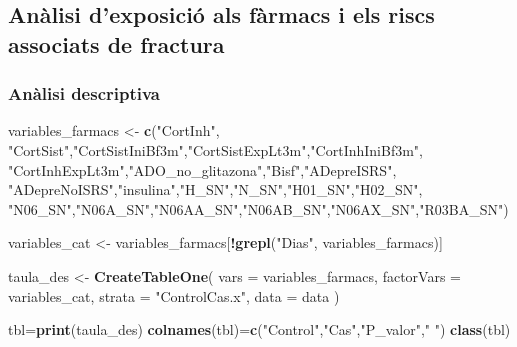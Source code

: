\documentclass[
]{article}
\newenvironment{Shaded}{\begin{snugshade}}{\end{snugshade}}
\newcommand{\AttributeTok}[1]{\textcolor[rgb]{0.13,0.29,0.53}{#1}}
\newcommand{\FunctionTok}[1]{\textcolor[rgb]{0.13,0.29,0.53}{\textbf{#1}}}
\newcommand{\NormalTok}[1]{#1}
\newcommand{\OtherTok}[1]{\textcolor[rgb]{0.56,0.35,0.01}{#1}}
\newcommand{\SpecialCharTok}[1]{\textcolor[rgb]{0.81,0.36,0.00}{\textbf{#1}}}
\newcommand{\StringTok}[1]{\textcolor[rgb]{0.31,0.60,0.02}{#1}}
\begin{document}
\subsection{Anàlisi d'exposició als fàrmacs i els riscs associats de
fractura}\label{anuxe0lisi-dexposiciuxf3-als-fuxe0rmacs-i-els-riscs-associats-de-fractura}

\subsubsection{Anàlisi descriptiva}\label{anuxe0lisi-descriptiva}

\label{anx:descrip}

\begin{Shaded}
\begin{Highlighting}[]
\NormalTok{variables\_farmacs }\OtherTok{\textless{}{-}} \FunctionTok{c}\NormalTok{(}\StringTok{"CortInh"}\NormalTok{,}
\StringTok{"CortSist"}\NormalTok{,}\StringTok{"CortSistIniBf3m"}\NormalTok{,}\StringTok{"CortSistExpLt3m"}\NormalTok{,}\StringTok{"CortInhIniBf3m"}\NormalTok{,}
\StringTok{"CortInhExpLt3m"}\NormalTok{,}\StringTok{"ADO\_no\_glitazona"}\NormalTok{,}\StringTok{"Bisf"}\NormalTok{,}\StringTok{"ADepreISRS"}\NormalTok{,}
\StringTok{"ADepreNoISRS"}\NormalTok{,}\StringTok{"insulina"}\NormalTok{,}\StringTok{"H\_SN"}\NormalTok{,}\StringTok{"N\_SN"}\NormalTok{,}\StringTok{"H01\_SN"}\NormalTok{,}\StringTok{"H02\_SN"}\NormalTok{,}
\StringTok{"N06\_SN"}\NormalTok{,}\StringTok{"N06A\_SN"}\NormalTok{,}\StringTok{"N06AA\_SN"}\NormalTok{,}\StringTok{"N06AB\_SN"}\NormalTok{,}\StringTok{"N06AX\_SN"}\NormalTok{,}\StringTok{"R03BA\_SN"}\NormalTok{)}

\NormalTok{variables\_cat }\OtherTok{\textless{}{-}}\NormalTok{ variables\_farmacs[}\SpecialCharTok{!}\FunctionTok{grepl}\NormalTok{(}\StringTok{"Dias"}\NormalTok{, variables\_farmacs)]}

\NormalTok{taula\_des }\OtherTok{\textless{}{-}} \FunctionTok{CreateTableOne}\NormalTok{(}
  \AttributeTok{vars =}\NormalTok{ variables\_farmacs,}
  \AttributeTok{factorVars =}\NormalTok{ variables\_cat,}
  \AttributeTok{strata =} \StringTok{"ControlCas.x"}\NormalTok{,}
  \AttributeTok{data =}\NormalTok{ data}
\NormalTok{)}

\NormalTok{tbl}\OtherTok{=}\FunctionTok{print}\NormalTok{(taula\_des)}
\FunctionTok{colnames}\NormalTok{(tbl)}\OtherTok{=}\FunctionTok{c}\NormalTok{(}\StringTok{"Control"}\NormalTok{,}\StringTok{"Cas"}\NormalTok{,}\StringTok{"P\_valor"}\NormalTok{,}\StringTok{" "}\NormalTok{)}
\FunctionTok{class}\NormalTok{(tbl)}
\end{Highlighting}
\end{Shaded}
\end{document}
